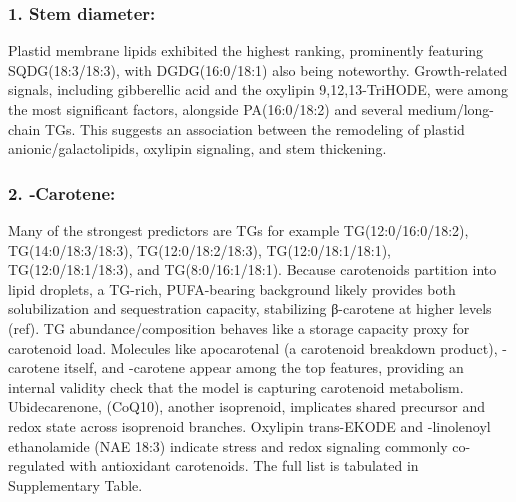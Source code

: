 \documentclass[10pt,letterpaper]{article}
\begin{document}
\begin{itemize}





\subsubsection*{1. Stem diameter:} 
Plastid membrane lipids exhibited the highest ranking, prominently featuring SQDG(18:3/18:3), with DGDG(16:0/18:1) also being noteworthy. Growth-related signals, including gibberellic acid and the oxylipin 9,12,13-TriHODE, were among the most significant factors, alongside PA(16:0/18:2) and several medium/long-chain TGs. This suggests an association between the remodeling of plastid anionic/galactolipids, oxylipin signaling, and stem thickening.

\subsubsection*{2. \textbeta‐Carotene:}
Many of the strongest predictors are TGs for example TG(12:0/16:0/18:2), TG(14:0/18:3/18:3), TG(12:0/18:2/18:3), TG(12:0/18:1/18:1), TG(12:0/18:1/18:3), and TG(8:0/16:1/18:1). Because carotenoids partition into lipid droplets, a TG-rich, PUFA-bearing background likely provides both solubilization and sequestration capacity, stabilizing β-carotene at higher levels (ref). TG abundance/composition behaves like a storage capacity proxy for carotenoid load.
Molecules like apocarotenal (a carotenoid breakdown product), \textbeta-carotene itself, and \textalpha-carotene appear among the top features, providing an internal validity check that the model is capturing carotenoid metabolism. Ubidecarenone, (CoQ10), another isoprenoid, implicates shared precursor and redox state across isoprenoid branches. Oxylipin trans-EKODE and \textgamma-linolenoyl ethanolamide (NAE 18:3) indicate stress and redox signaling commonly co-regulated with antioxidant carotenoids. The full list is tabulated in Supplementary Table. 


\end{itemize}
\end{document}
